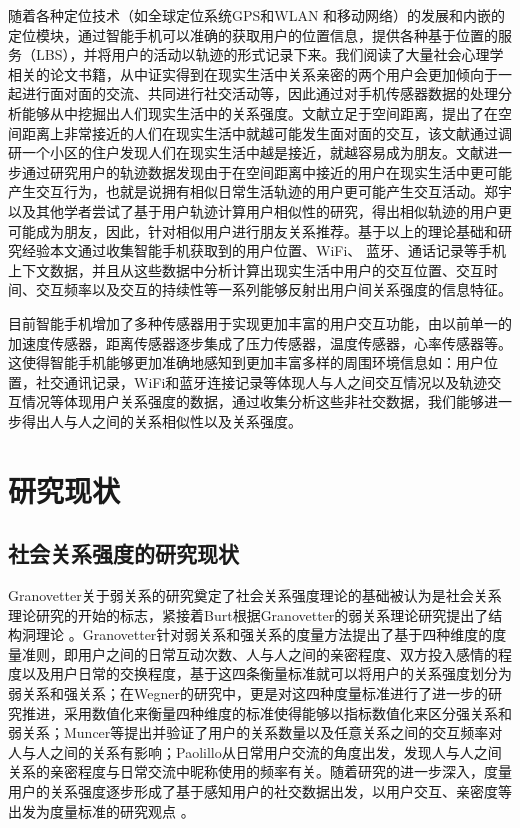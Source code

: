 \par 随着各种定位技术（如全球定位系统GPS和WLAN 和移动网络）的发展和内嵌的定位模块，通过智能手机可以准确的获取用户的位置信息，提供各种基于位置的服务（LBS），并将用户的活动以轨迹的形式记录下来。我们阅读了大量社会心理学相关的论文书籍，从中证实得到在现实生活中关系亲密的两个用户会更加倾向于一起进行面对面的交流、共同进行社交活动等，因此通过对手机传感器数据的处理分析能够从中挖掘出人们现实生活中的关系强度。文献\cite{zillmann2013selective}立足于空间距离，提出了在空间距离上非常接近的人们在现实生活中就越可能发生面对面的交互，该文献通过调研一个小区的住户发现人们在现实生活中越是接近，就越容易成为朋友。文献\cite{zajonc1968attitudinal,zillmann2000mood}进一步通过研究用户的轨迹数据发现由于在空间距离中接近的用户在现实生活中更可能产生交互行为，也就是说拥有相似日常生活轨迹的用户更可能产生交互活动。郑宇 以及其他学者尝试了基于用户轨迹计算用户相似性的研究，得出相似轨迹的用户更可能成为朋友，因此，针对相似用户进行朋友关系推荐。基于以上的理论基础和研究经验本文通过收集智能手机获取到的用户位置、WiFi、 蓝牙、通话记录等手机上下文数据，并且从这些数据中分析计算出现实生活中用户的交互位置、交互时间、交互频率以及交互的持续性等一系列能够反射出用户间关系强度的信息特征。

\par 目前智能手机增加了多种传感器用于实现更加丰富的用户交互功能，由以前单一的加速度传感器，距离传感器逐步集成了压力传感器，温度传感器，心率传感器等。这使得智能手机能够更加准确地感知到更加丰富多样的周围环境信息如：用户位置，社交通讯记录，WiFi和蓝牙连接记录等体现人与人之间交互情况以及轨迹交互情况等体现用户关系强度的数据，通过收集分析这些非社交数据，我们能够进一步得出人与人之间的关系相似性以及关系强度。


\section{研究现状}
\subsection{社会关系强度的研究现状}
Granovetter关于弱关系的研究奠定了社会关系强度理论的基础被认为是社会关系理论研究的开始的标志，紧接着Burt根据Granovetter的弱关系理论研究提出了结构洞理论
。Granovetter针对弱关系和强关系的度量方法提出了基于四种维度的度量准则，即用户之间的日常互动次数、人与人之间的亲密程度、双方投入感情的程度以及用户日常的交换程度，基于这四条衡量标准就可以将用户的关系强度划分为弱关系和强关系；在Wegner的研究中，更是对这四种度量标准进行了进一步的研究推进，采用数值化来衡量四种维度的标准使得能够以指标数值化来区分强关系和弱关系；Muncer等提出并验证了用户的关系数量以及任意关系之间的交互频率对人与人之间的关系有影响；Paolillo从日常用户交流的角度出发，发现人与人之间关系的亲密程度与日常交流中昵称使用的频率有关。随着研究的进一步深入，度量用户的关系强度逐步形成了基于感知用户的社交数据出发，以用户交互、亲密度等出发为度量标准的研究观点
。

